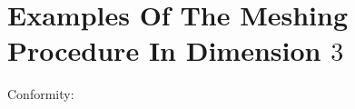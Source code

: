 \section{Examples Of The Meshing Procedure In Dimension $3$} %
\label{sec:examples_of_the_meshing_procedure}



\tauZero
{}
\tauOneEnCube
\tauOneEn
Conformity:
\conform


